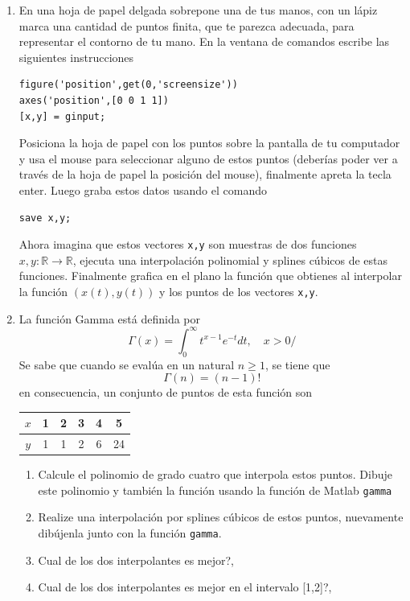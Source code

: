 \documentclass[letterpaper,11pt]{article}
\newcommand{\matlab}{{\sc Matlab} }
\begin{document}
\begin{enumerate}
\item En una hoja de papel delgada sobrepone una de tus manos, con un l\'apiz marca una cantidad de puntos finita, que te parezca adecuada, para representar el contorno de tu mano. En la ventana de comandos escribe las siguientes instrucciones
\begin{lstlisting}
figure('position',get(0,'screensize'))
axes('position',[0 0 1 1])
[x,y] = ginput;
\end{lstlisting}
Posiciona la hoja de papel con los puntos sobre la pantalla de tu computador y usa el mouse para seleccionar alguno de estos puntos (deberías poder ver a trav\'es de la hoja de papel la posici\'on del mouse), finalmente apreta la tecla enter. Luego graba estos datos usando el comando 
\begin{lstlisting}
save x,y;
\end{lstlisting}
Ahora imagina que estos vectores \texttt{x,y} son muestras de dos funciones $x,y:\mathbb{R}\rightarrow \mathbb{R}$, ejecuta una interpolaci\'on polinomial y splines c\'ubicos de estas funciones. Finalmente grafica en el plano la funci\'on que obtienes al interpolar la funci\'on $(x(t),y(t))$ y los puntos de los vectores \texttt{x,y}.

\item La funci\'on Gamma est\'a definida por
$$
\Gamma(x)=\int_0^\infty t^{x-1}e^{-t}dt, \quad x>0/
$$
Se sabe que cuando se eval\'ua en un natural $n \geq 1$, se tiene que 
$$
\Gamma(n)=(n-1)!
$$
en consecuencia, un conjunto de puntos de esta funci\'on son 
\begin{center}
\begin{tabular}{c|ccccc}
$x$ 	& 1 & 2	& 3 & 4 & 5 \\
\hline
$y$	& 1	& 1 & 2 & 6 & 24
\end{tabular}
\end{center}
\begin{enumerate}
\item Calcule el polinomio de grado cuatro que interpola estos puntos. Dibuje este polinomio y tambi\' en la funci\'on usando la funci\'on de \matlab \texttt{gamma}
\item Realize una interpolaci\'on por splines c\'ubicos de estos puntos, nuevamente dib\'ujenla junto con la funci\'on \texttt{gamma}.
\item \textquestiondown Cual de los dos interpolantes es mejor?,
\item \textquestiondown Cual de los dos interpolantes es mejor en el intervalo [1,2]?,
\end{enumerate}


\end{enumerate}
\end{document}
